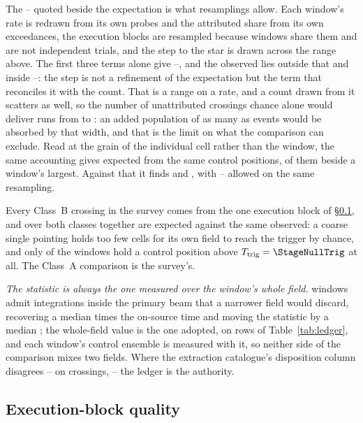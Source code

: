 The \CeLo--\CeHi{} quoted beside the expectation is what \CeNBoot{}
resamplings allow. Each window's rate is redrawn from its own \NCtrl{} probes
and the attributed share from its own \CeNExc{} exceedances, the execution
blocks are resampled because windows share them and are not independent
trials, and the step to the star is drawn across the range above. The first
three terms alone
give \CeLoNull--\CeHiNull, and the observed \CeObs{} lies outside that and
inside \CeLo--\CeHi: the step is not a refinement of the expectation but the
term that reconciles it with the count. That is a range on a rate, and a count
drawn from it scatters as well, so the number of unattributed crossings chance
alone would deliver runs from \CeCntLo{} to \CeCntHi: an added population of
as many as \CeAddBlind{} events would be absorbed by that width, and that is
the limit on what the comparison can exclude. Read at the grain of the
individual cell rather than the window, the same accounting gives \CkExp{}
expected from the same \CkNCtrlPos{} control positions, \CkExpSec{} of them
beside a window's largest. Against that it finds \CkNObs{} and
\CkNSecUnattr, with \CkLo--\CkHi{} allowed on the same resampling.

Every Class~B crossing in the survey comes from the one execution block of
\S\ref{sec:blockquality}, and over both classes together \CeExpSurv{} are
expected against the same \CeObs{} observed: a coarse single pointing holds
too few cells for its own field to reach the trigger by chance, and only
\NCtrlWinObs{} of the \NWindows{} windows hold a control position above
$T_{\rm trig}=\StageNullTrig$ at all. The Class~A comparison is the survey's.

\emph{The statistic is always the one measured over the window's whole field.}
\StNRep{} windows admit integrations inside the primary beam that a narrower
field would discard, recovering a median \StRepOnsrc{} times the on-source
time and moving the statistic by a median \StRepDT; the whole-field value is
the one adopted, on \StRepAdopted{} rows of Table~\ref{tab:ledger}, and each
window's control ensemble is measured with it, so neither side of the
comparison mixes two fields. Where the extraction catalogue's disposition
column disagrees -- on \StRepFell{} crossings, \StRepAttrClause{} -- the
ledger is the authority.

\subsection{Execution-block quality}
\label{sec:blockquality}

